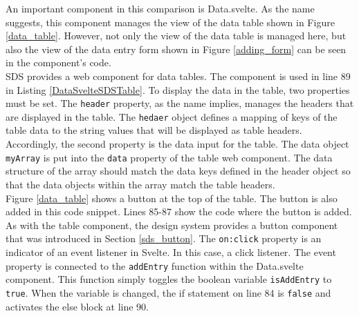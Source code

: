 An important component in this comparison is Data.svelte. As the name suggests, this component manages the view of the data table shown in Figure \ref{data_table}. However, not only the view of the data table is managed here, but also the view of the data entry form shown in Figure \ref{adding_form} can be seen in the component's code. \\

SDS provides a web component for data tables. The component is used in line 89 in Listing \ref{DataSvelteSDSTable}. To display the data in the table, two properties must be set. The \texttt{header} property, as the name implies, manages the headers that are displayed in the table. The \texttt{hedaer} object defines a mapping of keys of the table data to the string values that will be displayed as table headers. Accordingly, the second property is the data input for the table. The data object \texttt{myArray} is put into the \texttt{data} property of the table web component. The data structure of the array should match the data keys defined in the header object so that the data objects within the array match the table headers. \\
Figure \ref{data_table} shows a button at the top of the table. The button is also added in this code snippet. Lines 85-87 show the code where the button is added. As with the table component, the design system provides a button component that was introduced in Section \ref{sds_button}. The \texttt{on:click} property is an indicator of an event listener in Svelte. In this case, a click listener. The event property is connected to the \texttt{addEntry} function within the Data.svelte component. This function simply toggles the boolean variable \texttt{isAddEntry} to \texttt{true}. When the variable is changed, the if statement on line 84 is \texttt{false} and activates the else block at line 90. \\


